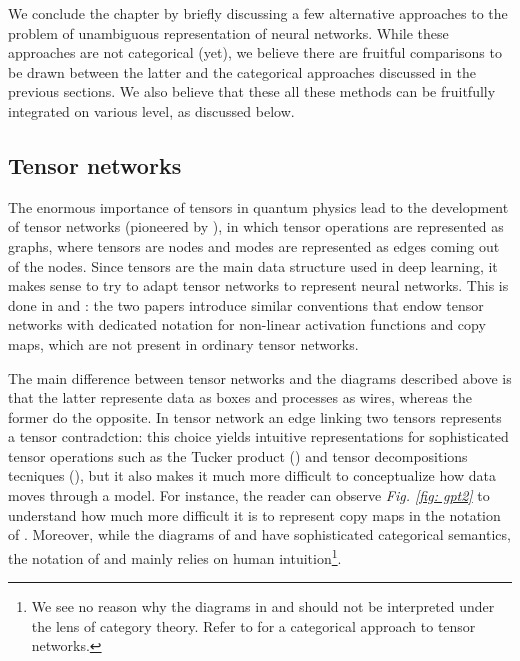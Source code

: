 \documentclass[11pt,a4paper,openright,twoside]{report}
\theoremstyle{plain}
\theoremstyle{definition}
\begin{document}
We conclude the chapter by briefly discussing a few alternative approaches to the problem of unambiguous representation of neural networks. While these approaches are not categorical (yet), we believe there are fruitful comparisons to be drawn between the latter and the categorical approaches discussed in the previous sections. We also believe that these all these methods can be fruitfully integrated on various level, as discussed below.

\subsection{Tensor networks}

The enormous importance of tensors in quantum physics lead to the development of tensor networks (pioneered by \cite{penrose1971applications}), in which tensor operations are represented as graphs, where tensors are nodes and modes are represented as edges coming out of the nodes. Since tensors are the main data structure used in deep learning, it makes sense to try to adapt tensor networks to represent neural networks. This is done in \cite{xu2023graph} and \cite{taylor2024introduction}: the two papers introduce similar conventions that endow tensor networks with dedicated notation for non-linear activation functions and copy maps, which are not present in ordinary tensor networks. 

The main difference between tensor networks and the diagrams described above is that the latter represente data as boxes and processes as wires, whereas the former do the opposite. In tensor network an edge linking two tensors represents a tensor contradction: this choice yields intuitive representations for sophisticated tensor operations such as the Tucker product (\cite{xu2023graph}) and tensor decompositions tecniques (\cite{taylor2024introduction}), but it also makes it much more difficult to conceptualize how data moves through a model. For instance, the reader can observe \textit{Fig. \ref{fig: gpt2}} to understand how much more difficult it is to represent copy maps in the notation of \cite{taylor2024introduction}. Moreover, while the diagrams of \cite{abbott2023robust} and \cite{khatri2024anatomy} have sophisticated categorical semantics, the notation of \cite{xu2023graph} and \cite{taylor2024introduction} mainly relies on human intuition\footnote{We see no reason why the diagrams in \cite{xu2023graph} and \cite{taylor2024introduction} should not be interpreted under the lens of category theory. Refer to \cite{biamonte2011categorical} for a categorical approach to tensor networks.}.
\end{document}
